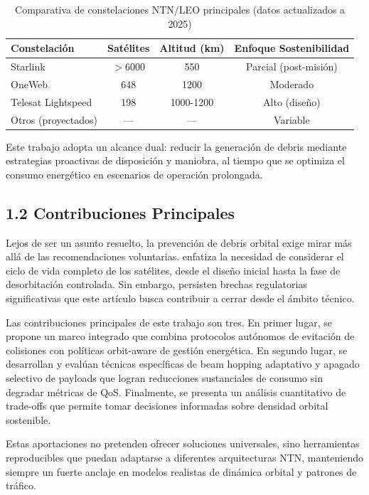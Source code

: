 \begin{table}[t]
\centering
\caption{Comparativa de constelaciones NTN/LEO principales (datos actualizados a 2025)}
\label{tab:comparativa_constelaciones}
\begin{tabular}{lccc}
\hline
Constelación & Satélites & Altitud (km) & Enfoque Sostenibilidad \\
\hline
Starlink & $>6000$ & 550 & Parcial (post-misión) \\
OneWeb & 648 & 1200 & Moderado \\
Telesat Lightspeed & 198 & 1000-1200 & Alto (diseño) \\
Otros (proyectados) & --- & --- & Variable \\
\hline
\end{tabular}
\end{table}

Este trabajo adopta un alcance dual: reducir la generación de debris mediante estrategias proactivas de disposición y maniobra, al tiempo que se optimiza el consumo energético en escenarios de operación prolongada.

\subsection{1.2 Contribuciones Principales}

Lejos de ser un asunto resuelto, la prevención de debris orbital exige mirar más allá de las recomendaciones voluntarias. \cite{Bennett2025} enfatiza la necesidad de considerar el ciclo de vida completo de los satélites, desde el diseño inicial hasta la fase de desorbitación controlada. Sin embargo, persisten brechas regulatorias significativas que este artículo busca contribuir a cerrar desde el ámbito técnico.

Las contribuciones principales de este trabajo son tres. En primer lugar, se propone un marco integrado que combina protocolos autónomos de evitación de colisiones con políticas orbit-aware de gestión energética. En segundo lugar, se desarrollan y evalúan técnicas específicas de beam hopping adaptativo y apagado selectivo de payloads que logran reducciones sustanciales de consumo sin degradar métricas de QoS. Finalmente, se presenta un análisis cuantitativo de trade-offs que permite tomar decisiones informadas sobre densidad orbital sostenible.

Estas aportaciones no pretenden ofrecer soluciones universales, sino herramientas reproducibles que puedan adaptarse a diferentes arquitecturas NTN, manteniendo siempre un fuerte anclaje en modelos realistas de dinámica orbital y patrones de tráfico.

